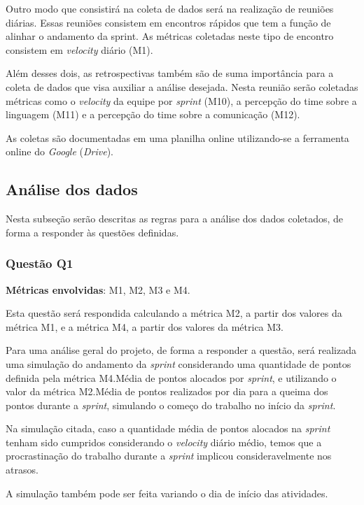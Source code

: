       Outro modo que consistirá na coleta de dados será na realização de reuniões diárias. Essas reuniões consistem em encontros rápidos que tem a função de alinhar o andamento da sprint. As métricas coletadas neste tipo de encontro consistem em \textit{velocity} diário (M1).

      Além desses dois, as retrospectivas também são de suma importância para a coleta de dados que visa auxiliar a análise desejada. Nesta reunião serão coletadas métricas como o \textit{velocity} da equipe por \textit{sprint} (M10), a percepção do time sobre a linguagem (M11) e a percepção do time sobre a comunicação (M12).

      As coletas são documentadas em uma planilha online utilizando-se a ferramenta online do \textit{Google} (\textit{Drive}).

      \subsection{Análise dos dados}

      	Nesta subseção serão descritas as regras para a análise dos dados coletados, de forma a responder às questões definidas.

      	\subsubsection{Questão Q1}

      		\textbf{Métricas envolvidas}: M1, M2, M3 e M4.

      		Esta questão será respondida calculando a métrica M2, a partir dos valores da métrica M1, e a métrica M4, a partir dos valores
      		da métrica M3.

      		Para uma análise geral do projeto, de forma a responder a questão, será realizada uma simulação do andamento da \textit{sprint} considerando uma quantidade de
      		pontos definida pela métrica M4.Média de pontos alocados por \textit{sprint}, e utilizando o valor da métrica M2.Média de pontos realizados por dia para a queima dos pontos durante a \textit{sprint}, simulando o começo do trabalho no início da \textit{sprint}.

      		Na simulação citada, caso a quantidade média de pontos alocados na \textit{sprint} tenham sido cumpridos considerando
      		o \textit{velocity} diário médio, temos que a procrastinação do trabalho durante a \textit{sprint} implicou
      		consideravelmente nos atrasos.

      		A simulação também pode ser feita variando o dia de início das atividades.

